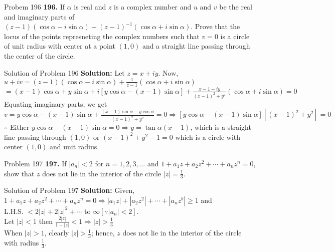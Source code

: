 \documentclass[aspectratio=169,8pt]{beamer}
\begin{document}
\begin{frame}{Probem 196}
  \textbf{196.} If $\alpha$ is real and $z$ is a complex number and $u$ and $v$ be the real and imaginary parts of $(z -
  1)(\cos\alpha -i\sin\alpha) + (z - 1)^{-1}(\cos\alpha + i\sin\alpha)$. Prove that the locus of the points represneting the
  complex numbers such that $v = 0$ is a circle of unit radius with center at a point $(1, 0)$ and a straight line passing through
  the center of the circle.
\end{frame}
\begin{frame}{Solution of Problem 196}
  \textbf{Solution:} Let $z = x + iy$. Now, $u + iv = (z - 1)(\cos\alpha - i\sin\alpha) + \frac{1}{z - 1}(\cos\alpha + i\sin\alpha)$\\
  \vspace*{0.2cm}
  $= (x - 1)\cos\alpha + y\sin\alpha + i[y\cos\alpha - (x - 1)\sin\alpha] + \frac{x - 1 - iy}{(x - 1)^2 + y^2}(\cos\alpha +
  i\sin\alpha) = 0$\\
  \vspace*{0.2cm}
  Equating imaginary parts, we get\\
  \vspace*{0.2cm}
  $v = y\cos\alpha - (x - 1)\sin\alpha + \frac{(x - 1)\sin\alpha - y\cos\alpha}{(x - 1)^2 + y^2} = 0\Rightarrow [y\cos\alpha - (x -
    1)\sin\alpha][(x - 1)^2 + y^2] = 0$\\
  \vspace*{0.2cm}
  $\therefore $ Either $y\cos\alpha - (x - 1)\sin\alpha = 0 \Rightarrow y = \tan\alpha(x - 1)$, which is a straight line passing
  through $(1, 0)$ or $(x - 1)^2 + y^2 - 1 = 0$ which is a circle with center $(1, 0)$ and unit radius.
\end{frame}
\begin{frame}{Problem 197}
  \textbf{197.} If $|a_n| < 2$ for $n = 1, 2, 3, \ldots$ and $1 + a_1z + a_2z^2 + \cdots + a_nz^n = 0$, show that $z$ does not lie
  in the interior of the circle $|z| = \frac{1}{3}$.
\end{frame}
\begin{frame}{Solution of Problem 197}
  \textbf{Solution:} Given, $1 + a_1z + a_2z^2 + \cdots + a_nz^n = 0 \Rightarrow |a_1z| + |a_2z^2| + \cdots + |a_nz^b|\geq 1$ and\\
  \vspace*{0.2cm}
  L.H.S. $ < 2|z| + 2|z|^2 + \cdots$ to $\infty[\because |a_n| < 2]$.\\
  \vspace*{0.2cm}
  Let $|z| < 1$ then $\frac{2|z|}{1 - |z|} < 1 \Rightarrow |z| > \frac{1}{3}$\\
  \vspace*{0.2cm}
  When $|z|> 1$, clearly $|z| > \frac{1}{3}$; hence, $z$ does not lie in the interior of the circle with radius $\frac{1}{3}$.
\end{frame}
\end{document}
